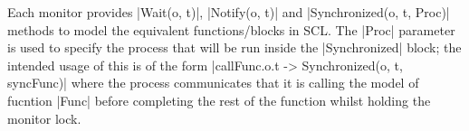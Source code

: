 Each monitor provides |Wait(o, t)|, |Notify(o, t)| and |Synchronized(o, t, Proc)| methods to model the equivalent functions/blocks in SCL. The |Proc| parameter is used to specify the process that will be run inside the |Synchronized| block; the intended usage of this is of the form |callFunc.o.t -> Synchronized(o, t, syncFunc)| where the process communicates that it is calling the model of fucntion |Func| before completing the rest of the function whilst holding the monitor lock.
